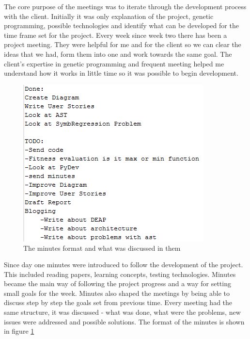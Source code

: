 The core purpose of the meetings was to iterate through the development process with the
client. Initially it was only explanation of the project, genetic programming, possible
technologies and identify what can be developed for the time frame set for the project.
Every week since week two there has been a project meeting. They were helpful for me and 
for the client so we can clear the ideas that we had, form them into one and work towards
the same goal. The client's expertise in genetic programming and frequent meeting helped me 
understand how it works in little time so it was possible to begin development.
\begin{figure}[htp]
\centering
\includegraphics[scale=0.8]{Figures/minutes.png}
\caption{The minutes format and what was discussed in them}
\label{fig:minutes}
\end{figure}
Since day one minutes were introduced to follow the development of the project. This included reading
papers, learning concepts, testing technologies. Minutes became the main way of following
the project progress and a way for setting small goals for the week. Minutes also shaped
the meetings by being able to discuss step by step the goals set from previous time. Every
meeting had the same structure, it was discussed - what was done, what were the problems, 
new issues were addressed and possible solutions. The format of the minutes is shown
in figure \ref{fig:minutes}
